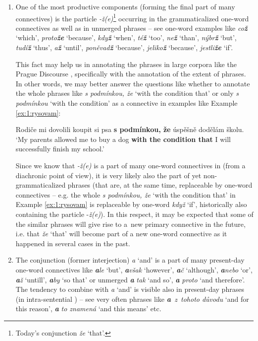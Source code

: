 \documentclass[output=paper]{langsci/langscibook.cls}
\begin{document}
\begin{enumerate}
\item One of the most productive components (forming the final part of many  connectives) is the particle \textit{{}-ž(e)}\footnote{ Today’s conjunction \textit{že} `that'.} occurring in the grammaticalized one-word connectives as well as in unmerged  phrases – see one-word examples like \textit{co\textbf{ž}} `which', \textit{proto\textbf{že}} `because', \textit{kdy\textbf{ž}} `when', \textit{té\textbf{ž}} `too', \textit{ne\textbf{ž}} `than', \textit{nýbr\textbf{ž}} `but', \textit{tudí\textbf{ž}} `thus', \textit{a\textbf{ž}} `until', \textit{poněvad\textbf{ž}} `because', \textit{jeliko\textbf{ž}} `because', \textit{jestli\textbf{že}} `if'.

This fact may help us in annotating the  phrases in large corpora like the Prague Discourse , specifically with the annotation of the extent of  phrases. In other words, we may better answer the questions like whether to annotate the whole phrases like \textit{s podmínkou, že} `with the condition that' or only \textit{s podmínkou} `with the condition' as a connective in examples like Example \ref{ex:1:rysovam}:

\ea
\label{ex:1:rysovam}
Rodiče mi dovolili koupit si psa \textbf{s podmínkou, že} úspěšně dodělám školu.
\glt
`My parents allowed me to buy a dog \textbf{with the condition that} I will successfully finish my school.'
\z

Since we know that \textit{{}-ž(e)} is a part of many one-word connectives in  (from a diachronic point of view), it is very likely also the part of yet non-grammaticalized phrases (that are, at the same time, replaceable by one-word connectives – e.g. the whole \textit{s podmínkou, že} `with the condition that' in Example \ref{ex:1:rysovam} is replaceable by one-word \textit{když }`if', historically also containing the particle -\textit{ž(e)}). In this respect, it may be expected that some of the similar  phrases will give rise to a~new primary connective in the future, i.e. that \textit{že }`that' will become part of a new one-word connective as it happened in several cases in the past.


\item The conjunction (former interjection) \textit{a} `and' is a part of many present-day one-word connectives like \textbf{\textit{a}}\textit{le} `but', \textbf{\textit{a}}\textit{však} `however', \textbf{\textit{a}}\textit{č} `although', \textbf{\textit{a}}\textit{nebo} `or', \textbf{\textit{a}}\textit{ž} `untill', \textbf{\textit{a}}\textit{by} `so that' or unmerged \textbf{\textit{a}}\textit{ tak} `and so', \textbf{\textit{a}}\textit{ proto} `and therefore'. The tendency to combine with\textit{ a} `and' is visible also in present-day  phrases (in intra-sentential ) – see very often phrases like \textbf{\textit{a}}\textit{~z~tohoto důvodu} `and for this reason', \textbf{\textit{a}}\textit{ to znamená} `and this means' etc. 



\end{enumerate}
\end{document}
